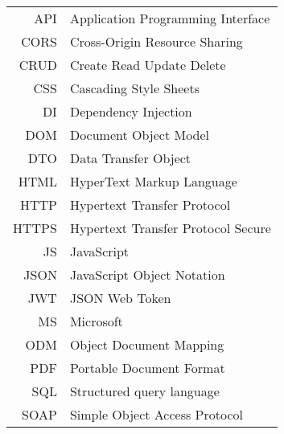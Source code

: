 \begin{longtable}{rl}
API & Application Programming Interface\\
CORS & Cross-Origin Resource Sharing\\
CRUD & Create Read Update Delete\\
CSS & Cascading Style Sheets\\
DI & Dependency Injection\\
DOM & Document Object Model\\
DTO & Data Transfer Object\\
HTML & HyperText Markup Language\\
HTTP & Hypertext Transfer Protocol\\
HTTPS & Hypertext Transfer Protocol Secure\\
JS & JavaScript\\
JSON & JavaScript Object Notation\\
JWT & JSON Web Token\\
MS & Microsoft\\
ODM & Object Document Mapping\\
PDF & Portable Document Format\\
SQL & Structured query language\\
SOAP & Simple Object Access Protocol\\

\end{longtable}
